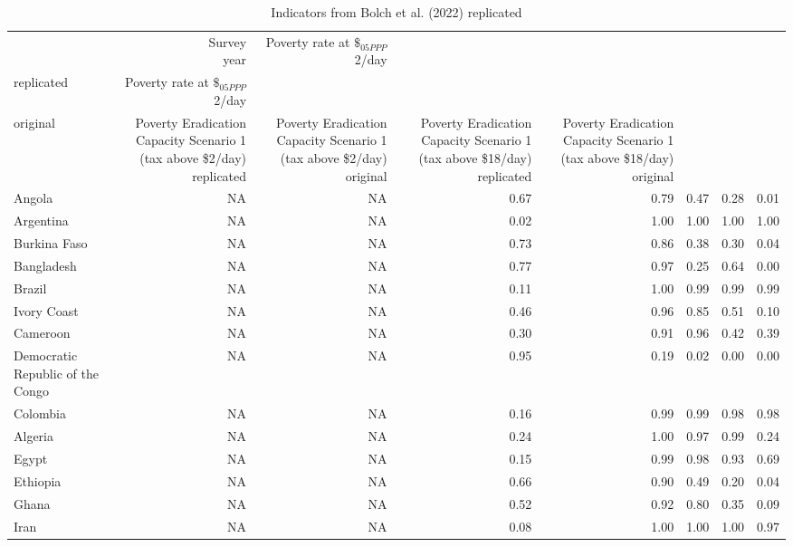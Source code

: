 
\begin{longtable}[t]{lrrrrrrr}
\caption{\label{tab:bolch_replication}Indicators from Bolch et al. (2022) replicated}\\
\toprule
  & \makecell{Survey\\year} & \makecell{Poverty rate\\at $\$_{05PPP}$2}/day\\replicated & \makecell{Poverty rate\\at $\$_{05PPP}$2}/day\\original & \makecell{Poverty Eradication Capacity\\Scenario 1 (tax above \$2/day)\\replicated} & \makecell{Poverty Eradication Capacity\\Scenario 1 (tax above \$2/day)\\original} & \makecell{Poverty Eradication Capacity\\Scenario 1 (tax above \$18/day)\\replicated} & \makecell{Poverty Eradication Capacity\\Scenario 1 (tax above \$18/day)\\original}\\
\midrule
Angola & NA & NA & 0.67 & 0.79 & 0.47 & 0.28 & 0.01\\
Argentina & NA & NA & 0.02 & 1.00 & 1.00 & 1.00 & 1.00\\
Burkina Faso & NA & NA & 0.73 & 0.86 & 0.38 & 0.30 & 0.04\\
Bangladesh & NA & NA & 0.77 & 0.97 & 0.25 & 0.64 & 0.00\\
Brazil & NA & NA & 0.11 & 1.00 & 0.99 & 0.99 & 0.99\\
Ivory Coast & NA & NA & 0.46 & 0.96 & 0.85 & 0.51 & 0.10\\
Cameroon & NA & NA & 0.30 & 0.91 & 0.96 & 0.42 & 0.39\\
Democratic Republic of the Congo & NA & NA & 0.95 & 0.19 & 0.02 & 0.00 & 0.00\\
Colombia & NA & NA & 0.16 & 0.99 & 0.99 & 0.98 & 0.98\\
Algeria & NA & NA & 0.24 & 1.00 & 0.97 & 0.99 & 0.24\\
Egypt & NA & NA & 0.15 & 0.99 & 0.98 & 0.93 & 0.69\\
Ethiopia & NA & NA & 0.66 & 0.90 & 0.49 & 0.20 & 0.04\\
Ghana & NA & NA & 0.52 & 0.92 & 0.80 & 0.35 & 0.09\\
Iran & NA & NA & 0.08 & 1.00 & 1.00 & 1.00 & 0.97\\

\end{longtable}
